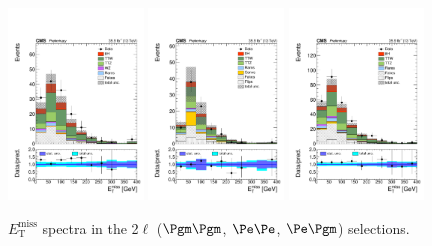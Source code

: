 \begin{figure}[htb]
	\centering 
\includegraphics[width=0.32\textwidth]{plots_leptons/lep_evtsel/2lss_SR/mm/kinMVA_input_met.pdf}
\includegraphics[width=0.32\textwidth]{plots_leptons/lep_evtsel/2lss_SR/ee/kinMVA_input_met.pdf}
\includegraphics[width=0.32\textwidth]{plots_leptons/lep_evtsel/2lss_SR/em/kinMVA_input_met.pdf}
	\caption{$E_\mathrm{T}^\mathrm{miss}$ spectra in the 2$\ell$ ($\Pgm\Pgm$, $\Pe\Pe$, $\Pe\Pgm$) selections.}
	\label{fig:2l_met}
\end{figure}
